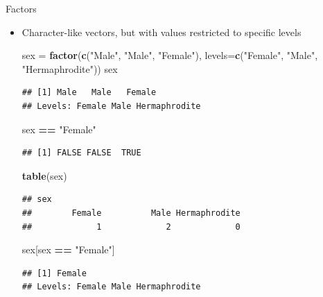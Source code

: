\documentclass[]{article}
\newenvironment{Shaded}{\begin{snugshade}}{\end{snugshade}}
\newcommand{\KeywordTok}[1]{\textcolor[rgb]{0.13,0.29,0.53}{\textbf{#1}}}
\newcommand{\DataTypeTok}[1]{\textcolor[rgb]{0.13,0.29,0.53}{#1}}
\newcommand{\StringTok}[1]{\textcolor[rgb]{0.31,0.60,0.02}{#1}}
\newcommand{\OperatorTok}[1]{\textcolor[rgb]{0.81,0.36,0.00}{\textbf{#1}}}
\newcommand{\NormalTok}[1]{#1}
\theoremstyle{definition}
\theoremstyle{definition}
\theoremstyle{remark}
\begin{document}
Factors

\begin{itemize}
\item
  Character-like vectors, but with values restricted to specific levels

\begin{Shaded}
\begin{Highlighting}[]
\NormalTok{sex =}\StringTok{ }\KeywordTok{factor}\NormalTok{(}\KeywordTok{c}\NormalTok{(}\StringTok{"Male"}\NormalTok{, }\StringTok{"Male"}\NormalTok{, }\StringTok{"Female"}\NormalTok{),}
             \DataTypeTok{levels=}\KeywordTok{c}\NormalTok{(}\StringTok{"Female"}\NormalTok{, }\StringTok{"Male"}\NormalTok{, }\StringTok{"Hermaphrodite"}\NormalTok{))}
\NormalTok{sex}
\end{Highlighting}
\end{Shaded}

\begin{verbatim}
## [1] Male   Male   Female
## Levels: Female Male Hermaphrodite
\end{verbatim}

\begin{Shaded}
\begin{Highlighting}[]
\NormalTok{sex }\OperatorTok{==}\StringTok{ "Female"}
\end{Highlighting}
\end{Shaded}

\begin{verbatim}
## [1] FALSE FALSE  TRUE
\end{verbatim}

\begin{Shaded}
\begin{Highlighting}[]
\KeywordTok{table}\NormalTok{(sex)}
\end{Highlighting}
\end{Shaded}

\begin{verbatim}
## sex
##        Female          Male Hermaphrodite 
##             1             2             0
\end{verbatim}

\begin{Shaded}
\begin{Highlighting}[]
\NormalTok{sex[sex }\OperatorTok{==}\StringTok{ "Female"}\NormalTok{]}
\end{Highlighting}
\end{Shaded}

\begin{verbatim}
## [1] Female
## Levels: Female Male Hermaphrodite
\end{verbatim}
\end{itemize}
\end{document}

